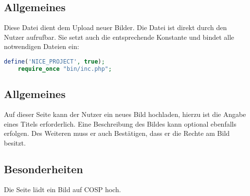 \subsection{Allgemeines} Diese Datei dient dem Upload neuer Bilder.
Die Datei ist direkt durch den Nutzer aufrufbar. Sie setzt auch die entsprechende Konstante und bindet alle notwendigen Dateien ein:
\begin{lstlisting}[language=php]
	define('NICE_PROJECT', true);
	require_once "bin/inc.php";
\end{lstlisting}
\subsection{Allgemeines}
Auf dieser Seite kann der Nutzer ein neues Bild hochladen, hierzu ist die Angabe eines Titels erforderlich. Eine Beschreibung des Bildes kann optional ebenfalls erfolgen. Des Weiteren muss er auch Bestätigen, dass er die Rechte am Bild besitzt.
\subsection{Besonderheiten}
Die Seite lädt ein Bild auf {\glqq COSP\grqq} hoch.